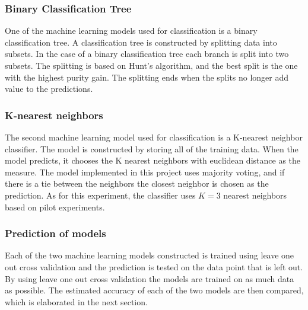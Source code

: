 \documentclass[11pt, fleqn, titlepage]{article}
\begin{document}
\subsubsection*{Binary Classification Tree}  \vspace*{-0.2cm}
One of the machine learning models used for classification is a binary classification tree. A classification tree is constructed by splitting data into subsets. In the case of a binary classification tree each branch is split into two subsets. The splitting is based on Hunt's algorithm, and the best split is the one with the highest purity gain. The splitting ends when the splits no longer add value to the predictions.
\vspace*{-0.2cm}
\subsubsection*{K-nearest neighbors}  \vspace*{-0.2cm}
The second machine learning model used for classification is a K-nearest neighbor classifier. The model is constructed by storing all of the training data. When the model predicts, it chooses the K nearest neighbors with euclidean distance as the measure. The model implemented in this project uses majority voting, and if there is a tie between the neighbors the closest neighbor is chosen as the prediction. As for this experiment, the classifier uses $ K=3 $ nearest neighbors based on pilot experiments.
\vspace*{-0.2cm}
\subsubsection*{Prediction of models}  \vspace*{-0.2cm}
Each of the two machine learning models constructed is trained using leave one out cross validation and the prediction is tested on the data point that is left out. By using leave one out cross validation the models are trained on as much data as possible. The estimated accuracy of each of the two models are then compared, which is elaborated in the next section.
\vspace*{-0.2cm}
\end{document}
